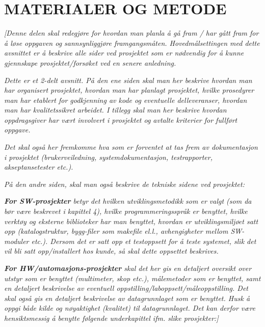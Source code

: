 \documentclass[../main.tex]{subfiles}
\begin{document}
\section{MATERIALER OG METODE}

\bigskip

{\itshape\color{blue}
[Denne delen skal redegj{\o}re for hvordan man planla {\aa} g{\aa} fram / har g{\aa}tt fram for {\aa} l{\o}se oppgaven
og sannsynliggj{\o}re framgangsm{\aa}ten. Hovedm{\aa}lsettingen med dette avsnittet er {\aa} beskrive alle sider ved
prosjektet som er n{\o}dvendig for {\aa} kunne gjennskape prosjektet/fors{\o}ket ved en senere anledning.}

{\itshape\color{blue}
Dette er et 2-delt avsnitt. P{\aa} den ene siden skal man her beskrive hvordan man har organisert prosjektet, hvordan
man har planlagt prosjektet, hvilke prosedyrer man har etablert for godkjenning av kode og eventuelle delleveranser,
hvordan man har kvalitetssikret arbeidet. I tillegg skal man her beskrive hvordan oppdragsgiver har v{\ae}rt involvert
i prosjektet og avtalte kriterier for fullf{\o}rt oppgave.}

{\itshape\color{blue}
Det skal ogs{\aa} her fremkomme hva som er forventet at tas frem av dokumentasjon i prosjektet (brukerveiledning,
systemdokumentasjon, testrapporter, akseptansetester etc.).}

{\itshape\color{blue}
P{\aa} den andre siden, skal man ogs{\aa} beskrive de tekniske sidene ved prosjektet: }

{\itshape\color{blue}
\textbf{For SW-prosjekter} betyr det hvilken utviklingsmetodikk som er valgt (som da b{\o}r v{\ae}re beskrevet i
kapittel 4), hvilke programmeringsspr{\aa}k er benyttet, hvilke verkt{\o}y og eksterne biblioteker har man benyttet,
hvordan er utviklingsmilj{\o}et satt opp (katalogstruktur, bygg-filer som makefile el.l., avhengigheter mellom
SW-moduler etc.). Dersom det er satt opp et testoppsett for {\aa} teste systemet, slik det vil bli satt opp/installert
hos kunde, s{\aa} skal dette oppsettet beskrives.}

{\itshape\color{blue}
\textbf{For HW/automasjons-prosjekter }skal det her gis en detaljert oversikt over utstyr som er benyttet (multimeter,
skop etc.), m{\aa}lemetoder som er benyttet, samt en detaljert beskrivelse av eventuell
oppstilling/laboppsett/m{\aa}leoppstilling. Det skal ogs{\aa} gis en detaljert beskrivelse av datagrunnlaget som er
benyttet. Husk {\aa} oppgi b{\aa}de kilde og n{\o}yaktighet (kvalitet) til datagrunnlaget. Det kan derfor v{\ae}re
hensiktsmessig {\aa} benytte f{\o}lgende underkapittel ifm. slike prosjekter:]}
\end{document}
